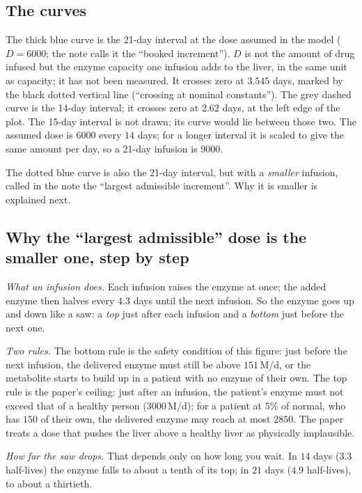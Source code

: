 \documentclass[11pt,a4paper]{article}
\newcommand{\um}{\,\textmu M/d}
\begin{document}
\subsection{The curves} The thick blue curve is the 21-day interval at the dose assumed in the
model ($D=6000$; the note calls it the ``booked increment''). $D$ is not the amount of drug
infused but the enzyme capacity one infusion adds to the liver, in the same unit as capacity; it
has not been measured. It crosses zero at $3.545$ days, marked by the black
dotted vertical line (``crossing at nominal constants''). The grey dashed curve is the 14-day
interval; it crosses zero at $2.62$ days, at the left edge of the plot. The 15-day interval is not
drawn; its curve would lie between those two. The assumed dose is $6000$ every $14$ days; for a
longer interval it is scaled to give the same amount per day, so a 21-day infusion is $9000$.

The dotted blue curve is also the 21-day interval, but with a \emph{smaller} infusion, called
in the note the ``largest admissible increment''. Why it is smaller is explained next.

\subsection{Why the ``largest admissible'' dose is the smaller one, step by step}
\emph{What an infusion does.} Each infusion raises the enzyme at once; the added enzyme then
halves every $4.3$ days until the next infusion. So the enzyme goes up and down like a saw: a
\emph{top} just after each infusion and a \emph{bottom} just before the next one.

\emph{Two rules.} The bottom rule is the safety condition of this figure: just before the next
infusion, the delivered enzyme must still be above $151$\um, or the metabolite starts to build
up in a patient with no enzyme of their own. The top rule is the paper's ceiling: just after an
infusion, the patient's enzyme must not exceed that of a healthy person ($3000$\um); for a patient
at $5\%$ of normal, who has $150$ of their own, the delivered enzyme may reach at most $2850$. The
paper treats a dose that pushes the liver above a healthy liver as physically implausible.

\emph{How far the saw drops.} That depends only on how long you wait. In $14$ days ($3.3$
half-lives) the enzyme falls to about a tenth of its top; in $21$ days ($4.9$ half-lives), to
about a thirtieth.
\end{document}
